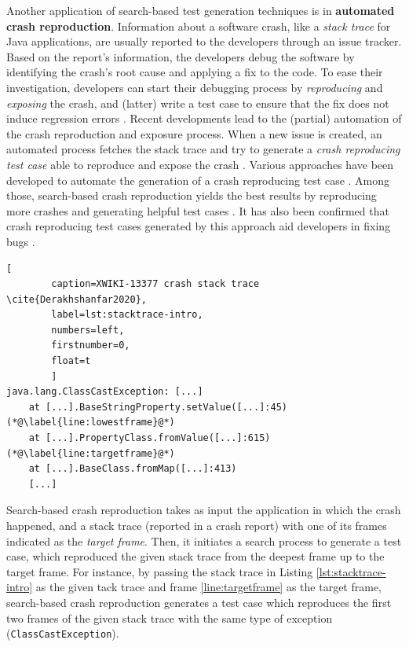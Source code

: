 Another application of search-based test generation techniques is in \textbf{automated crash reproduction}. 
Information about a software crash, like a \textit{stack trace} for Java applications, are usually reported to the developers through an issue tracker. Based on the report's information, the developers debug the software by identifying the crash's root cause and applying a fix to the code. To ease their investigation, developers can start their debugging process by \textit{reproducing} and \textit{exposing} the crash, and (latter) write a test case to ensure that the fix does not induce regression errors \cite{Zeller2009}. 
%
Recent developments lead to the (partial) automation of the crash reproduction and exposure process. When a new issue is created, an automated process fetches the stack trace and try to generate a \emph{crash reproducing test case} able to reproduce and expose the crash  \cite{Gagliardi2019}. Various approaches have been developed to automate the generation of a crash reproducing test case \cite{Nayrolles2017, Soltani2018a, Chen2015, Xuan2015}. Among those, search-based crash reproduction yields the best results by reproducing more crashes and generating helpful test cases \cite{Soltani2018a}. It has also been confirmed that crash reproducing test cases generated by this approach aid developers in fixing bugs \cite{Soltani2018a}.

\begin{lstlisting}[
        caption=XWIKI-13377 crash stack trace \cite{Derakhshanfar2020},
        label=lst:stacktrace-intro,
        numbers=left,
        firstnumber=0,
        float=t
        ]
java.lang.ClassCastException: [...]
    at [...].BaseStringProperty.setValue([...]:45) (*@\label{line:lowestframe}@*)
    at [...].PropertyClass.fromValue([...]:615) (*@\label{line:targetframe}@*)
    at [...].BaseClass.fromMap([...]:413)
    [...] 
\end{lstlisting}

Search-based crash reproduction takes as input the application in which the crash happened, and a stack trace (reported in a crash report) with one of its frames indicated as the \textit{target frame}. Then, it initiates a search process to generate a test case, which reproduced the given stack trace from the deepest frame up to the target frame. For instance, by passing the stack trace in Listing \ref{lst:stacktrace-intro} as the given tack trace and frame \ref{line:targetframe} as the target frame, search-based crash reproduction generates a test case which reproduces the first two frames of the given stack trace with the same type of exception (\texttt{ClassCastException}).


